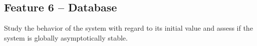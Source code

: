 \documentclass[a4paper]{article} %
\begin{document}
\subsection*{Feature 6 -- Database}
\label{task1:feature6}

Study the behavior of the system with regard to its initial value and assess if the system is globally asymptotically stable.







\clearpage %
\end{document}
